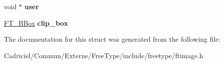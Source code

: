 \begin{DoxyCompactItemize}
\item 
\hypertarget{struct_f_t___raster___params___af78bac59f93c989840bbcbcbefd77c55}{void $\ast$ {\bfseries user}}\label{struct_f_t___raster___params___af78bac59f93c989840bbcbcbefd77c55}

\item 
\hypertarget{struct_f_t___raster___params___ab32f75f19d9cacb20e410886c055e306}{\hyperlink{struct_f_t___b_box__}{F\-T\-\_\-\-B\-Box} {\bfseries clip\-\_\-box}}\label{struct_f_t___raster___params___ab32f75f19d9cacb20e410886c055e306}

\end{DoxyCompactItemize}


The documentation for this struct was generated from the following file\-:\begin{DoxyCompactItemize}
\item 
Cadriciel/\-Commun/\-Externe/\-Free\-Type/include/freetype/ftimage.\-h\end{DoxyCompactItemize}
